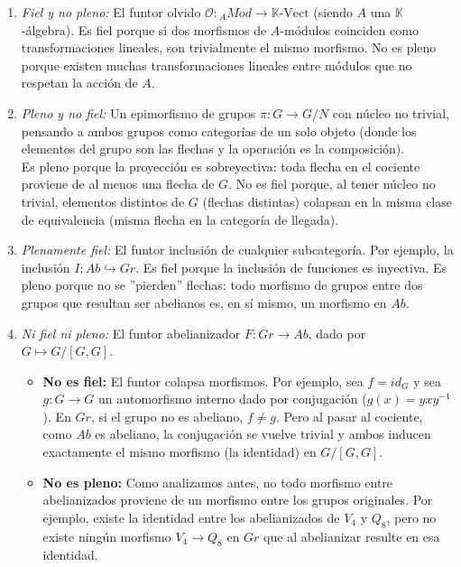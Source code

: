 \documentclass{article}
\theoremstyle{plain}
\theoremstyle{definition}
\theoremstyle{remark}
\begin{document}
\begin{enumerate}
   \item \textit{Fiel y no pleno:} El funtor olvido $\mathcal{O}: {}_A Mod \longrightarrow \mathbb{K}\text{-Vect}$ (siendo $A$ una $\mathbb{K}$-álgebra). Es fiel porque si dos morfismos de $A$-módulos coinciden como transformaciones lineales, son trivialmente el mismo morfismo. No es pleno porque existen muchas transformaciones lineales entre módulos que no respetan la acción de $A$.

   \item \textit{Pleno y no fiel:} Un epimorfismo de grupos $\pi: G \longrightarrow G/N$ con núcleo no trivial, pensando a ambos grupos como categorías de un solo objeto (donde los elementos del grupo son las flechas y la operación es la composición). \\

    Es pleno porque la proyección es sobreyectiva: toda flecha en el cociente proviene de al menos una flecha de $G$. No es fiel porque, al tener núcleo no trivial, elementos distintos de $G$ (flechas distintas) colapsan en la misma clase de equivalencia (misma flecha en la categoría de llegada).


    \item \textit{Plenamente fiel:} El funtor inclusión de cualquier subcategoría. Por ejemplo, la inclusión $I: Ab \hookrightarrow Gr$. Es fiel porque la inclusión de funciones es inyectiva. Es pleno porque no se ''pierden'' flechas: todo morfismo de grupos entre dos grupos que resultan ser abelianos es, en sí mismo, un morfismo en $Ab$.

    \item \textit{Ni fiel ni pleno:} El funtor abelianizador $F: Gr \longrightarrow Ab$, dado por $G \longmapsto G/[G,G]$.
    \begin{itemize}
        \item \textbf{No es fiel:} El funtor colapsa morfismos. Por ejemplo, sea $f = id_G$ y sea $g: G \to G$ un automorfismo interno dado por conjugación ($g(x) = yxy^{-1}$). En $Gr$, si el grupo no es abeliano, $f \neq g$. Pero al pasar al cociente, como $Ab$ es abeliano, la conjugación se vuelve trivial y ambos inducen exactamente el mismo morfismo (la identidad) en $G/[G,G]$.
        \item \textbf{No es pleno:} Como analizamos antes, no todo morfismo entre abelianizados proviene de un morfismo entre los grupos originales. Por ejemplo, existe la identidad entre los abelianizados de $V_4$ y $Q_8$, pero no existe ningún morfismo $V_4 \to Q_8$ en $Gr$ que al abelianizar resulte en esa identidad.
    \end{itemize}

\end{enumerate}
\end{document}
